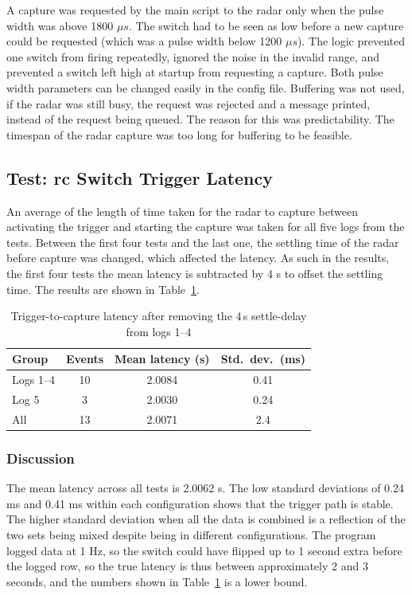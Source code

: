 A capture was requested by the main script to the radar only when the pulse width was above 1800 $\mu s$. The switch had to be seen as low before a new capture could be requested (which was a pulse width below 1200 $\mu s$). The logic prevented one switch from firing repeatedly, ignored the noise in the invalid range, and prevented a switch left high at startup from requesting a capture. Both pulse width parameters can be changed easily in the config file. Buffering was not used, if the radar was still busy, the request was rejected and a message printed, instead of the request being queued. The reason for this was predictability. The timespan of the radar capture was too long for buffering to be feasible. 

\subsection{Test: \texorpdfstring{\gls{rc}}{RC} Switch Trigger Latency}

An average of the length of time taken for the radar to capture between activating the trigger and starting the capture was taken for all five logs from the  tests. Between the first four tests and the last one, the settling time of the radar before capture was changed, which affected the latency. As such in the results, the first four tests the mean latency is subtracted by 4 s to offset the settling time. The results are shown in Table~\ref{tab:ch4-capture_latency}.


\begin{table}[H]
\centering
\caption{Trigger-to-capture latency after removing the 4\,s settle-delay from logs 1--4}
\label{tab:ch4-capture_latency}
\begin{tabular}{lccc}
\toprule
Group & Events & Mean latency (s) & Std.\ dev.\ (ms) \\
\midrule
Logs 1--4 & 10 & 2.0084 & 0.41 \\
Log 5     & 3  & 2.0030 & 0.24 \\
\midrule
All       & 13 & 2.0071 & 2.4  \\
\bottomrule
\end{tabular}
\end{table}


\subsubsection{Discussion}

The mean latency across all tests is 2.0062 s. The low standard deviations of 0.24 ms and 0.41 ms within each configuration shows that the trigger path is stable. The higher standard deviation when all the data is combined is a reflection of the two sets being mixed despite being in different configurations.  The program logged data at 1 Hz, so the switch could have flipped up to 1 second extra before the logged row, so the true latency is thus between approximately 2 and 3 seconds, and the numbers shown in Table~\ref{tab:ch4-capture_latency} is a lower bound. 

